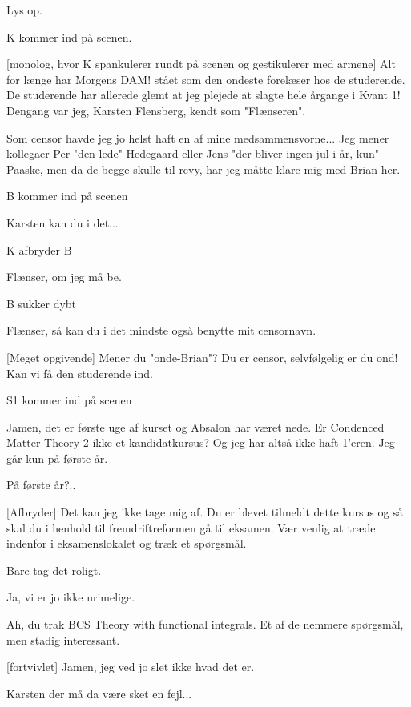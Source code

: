 \documentclass[a4paper,11pt]{article}
\begin{document}
\begin{sketch}

\scene Lys op.

K kommer ind på scenen.

[monolog, hvor K spankulerer rundt på scenen og gestikulerer med armene] Alt for længe har Morgens DAM! stået som den ondeste forelæser hos de studerende. De studerende har allerede glemt at jeg plejede at 
slagte hele årgange i Kvant 1! Dengang var jeg, Karsten Flensberg, kendt som "Flænseren".

Som censor havde jeg jo helst haft en af mine medsammensvorne... Jeg mener kollegaer Per "den lede" Hedegaard eller 
Jens "der bliver ingen jul i år, kun" Paaske, men da de begge skulle til revy, har jeg måtte klare mig med Brian 
her.

B kommer ind på scenen

 Karsten kan du i det...

K afbryder B

 Flænser, om jeg må be.

B sukker dybt

 Flænser, så kan du i det mindste også benytte mit censornavn.

[Meget opgivende] Mener du "onde-Brian"? Du er censor, selvfølgelig er du ond! Kan vi få den studerende ind.

S1 kommer ind på scenen

 Jamen, det er første uge af kurset og Absalon har været nede. Er Condenced Matter Theory 2 ikke et kandidatkursus? Og jeg har altså ikke haft 1'eren. Jeg går kun på første år.

 På første år?..

[Afbryder] Det kan jeg ikke tage mig af. Du er blevet tilmeldt dette kursus og så skal du i henhold til fremdriftreformen gå til eksamen. Vær venlig at træde indenfor i eksamenslokalet og træk et spørgsmål.

 Bare tag det roligt.

 Ja, vi er jo ikke urimelige.

 Ah, du trak BCS Theory with functional integrals. Et af de nemmere spørgsmål, men stadig interessant.

[fortvivlet] Jamen, jeg ved jo slet ikke hvad det er.

 Karsten der må da være sket en fejl...


\end{sketch}
\end{document}
